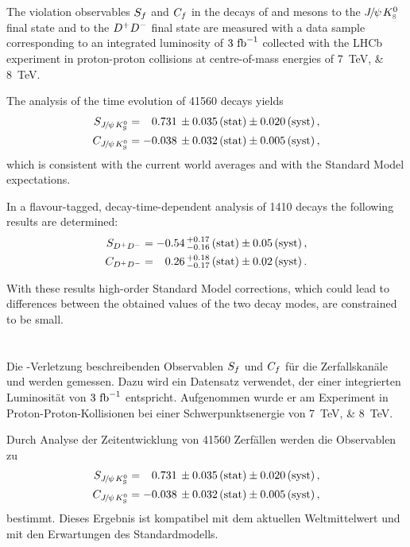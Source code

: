 
\section*{\centering\abstractname}
The \CP violation observables $S_{f}$ and $C_{f}$ in the decays of \Bd and \Bzb mesons
to the ${{J\mskip -3mu/\mskip -2mu\psi\mskip 2mu}}{{K}^0_{\mathrm{ \scriptscriptstyle S}}}$ final state and to the ${{D}^+}{{D}^-}$ final state are measured with
a data sample corresponding to an integrated luminosity of $\SI{3}{\ensuremath{\mbox{\,fb}^{-1}}}$
collected with the LHCb experiment in proton-proton collisions at
centre-of-mass energies of \SIlist{7;8}{\TeV}.

The analysis of the time evolution of \num{41560} \BdToJPsiKS decays yields
\begin{align*}
  S_{{{J\mskip -3mu/\mskip -2mu\psi\mskip 2mu}}{{K}^0_{\mathrm{ \scriptscriptstyle S}}}} &=  \phantom{-}0.731 \, \pm 0.035 \, \text{(stat)} \pm 0.020 \, \text{(syst)}\,, \\
  C_{{{J\mskip -3mu/\mskip -2mu\psi\mskip 2mu}}{{K}^0_{\mathrm{ \scriptscriptstyle S}}}} &=  			- 0.038 \, \pm 0.032 \, \text{(stat)} \pm 0.005 \, \text{(syst)}\,,
\end{align*}
which is consistent with the current world averages and with the
Standard Model expectations.

In a flavour-tagged, decay-time-dependent analysis of \num{1410} \BdToDD
decays the following results are determined:
\begin{align*}
  S_{{{D}^+}{{D}^-}} &=  -0.54 \, ^{+0.17}_{-0.16} \, \text{(stat)} \pm 0.05 \, \text{(syst)}\,, \\
  C_{{{D}^+}{{D}^-}} &=  \phantom{-}0.26 \, ^{+0.18}_{-0.17} \, \text{(stat)} \pm 0.02 \, \text{(syst)}\,.
\end{align*}

With these results high-order Standard Model corrections, which could lead to
differences between the obtained values of the two decay modes, are constrained
to be small.


\section*{\centering\abstractname}
Die \CP-Verletzung beschreibenden Observablen $S_{f}$ und $C_{f}$ für die
Zerfallskanäle \BdToJPsiKS und \BdToDD werden gemessen. Dazu wird ein
Datensatz verwendet, der einer integrierten Luminosität von $\SI{3}{\ensuremath{\mbox{\,fb}^{-1}}}$
entspricht. Aufgenommen wurde er am \lhcb Experiment in
Proton-Proton-Kollisionen bei einer Schwerpunktsenergie von
\SIlist[list-pair-separator={ und }]{7;8}{\TeV}.

Durch Analyse der Zeitentwicklung von \num{41560} \BdToJPsiKS Zerfällen werden die \CP Observablen zu
\begin{align*}
  S_{{{J\mskip -3mu/\mskip -2mu\psi\mskip 2mu}}{{K}^0_{\mathrm{ \scriptscriptstyle S}}}} &=  \phantom{-}0.731 \, \pm 0.035 \, \text{(stat)} \pm 0.020 \, \text{(syst)}\,, \\
  C_{{{J\mskip -3mu/\mskip -2mu\psi\mskip 2mu}}{{K}^0_{\mathrm{ \scriptscriptstyle S}}}} &=  			- 0.038 \, \pm 0.032 \, \text{(stat)} \pm 0.005 \, \text{(syst)}\,,
\end{align*}
bestimmt. Dieses Ergebnis ist kompatibel mit dem aktuellen Weltmittelwert und
mit den Erwartungen des Standardmodells.

